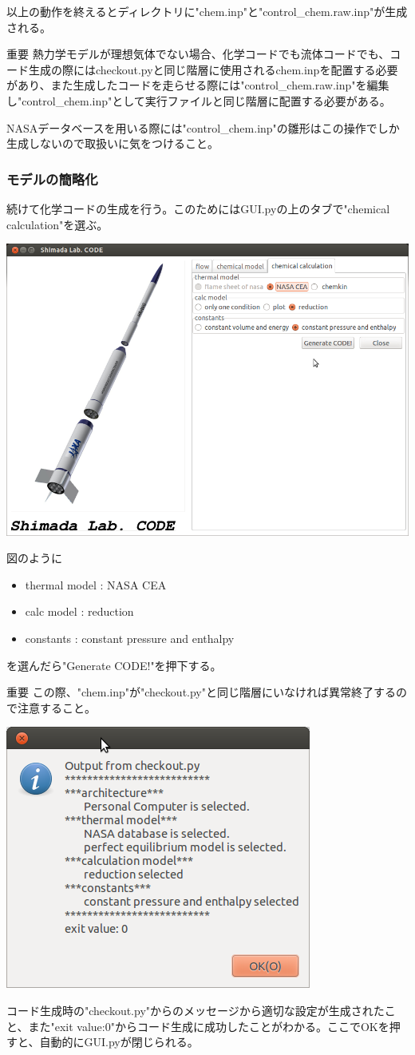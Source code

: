 \documentclass{jsarticle}
\begin{document}
以上の動作を終えるとディレクトリに"chem.inp"と"control\_chem.raw.inp"が生成される。
\begin{itembox}[l]{重要}
熱力学モデルが理想気体でない場合、化学コードでも流体コードでも、コード生成の際にはcheckout.pyと同じ階層に使用されるchem.inpを配置する必要があり、また生成したコードを走らせる際には"control\_chem.raw.inp"を編集し"control\_chem.inp"として実行ファイルと同じ階層に配置する必要がある。

NASAデータベースを用いる際には"control\_chem.inp"の雛形はこの操作でしか生成しないので取扱いに気をつけること。
\end{itembox}

\subsubsection{モデルの簡略化}
続けて化学コードの生成を行う。このためにはGUI.pyの上のタブで"chemical calculation"を選ぶ。
\begin{center}
\includegraphics[width=.7\textwidth,bb=0 0 895 649]{tutorial_img/050.png}
\end{center}
図のように
\begin{itemize}
\item thermal model : NASA CEA
\item calc model : reduction
\item constants : constant pressure and enthalpy
\end{itemize}
を選んだら"Generate CODE!"を押下する。
\begin{itembox}[l]{重要}
この際、"chem.inp"が"checkout.py"と同じ階層にいなければ異常終了するので注意すること。
\end{itembox}
\begin{center}
\includegraphics[width=.4\textwidth,bb=0 0 380 327]{tutorial_img/060.png}
\end{center}
コード生成時の"checkout.py"からのメッセージから適切な設定が生成されたこと、また"exit value:0"からコード生成に成功したことがわかる。ここでOKを押すと、自動的にGUI.pyが閉じられる。
\end{document}
